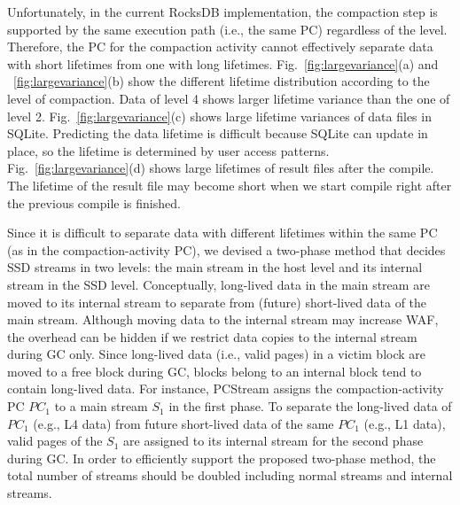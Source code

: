 
Unfortunately, in the current RocksDB implementation, the compaction step is supported 
by the same execution path (i.e., the same PC) regardless of the level.
Therefore, the PC for the compaction activity cannot effectively separate data with 
short lifetimes from one with long lifetimes.
Fig.~\ref{fig:largevariance}(a) and ~\ref{fig:largevariance}(b) show
the different lifetime distribution according to the level of compaction.
Data of level 4 shows larger lifetime variance than the one of level 2.
Fig.~\ref{fig:largevariance}(c) shows large lifetime variances of data files in
SQLite.
Predicting the data lifetime is difficult because 
SQLite can update in place, so the lifetime is determined by 
user access patterns.
Fig.~\ref{fig:largevariance}(d) shows large lifetimes of result files after the compile.
The lifetime of the result file may become short when we start compile right after 
the previous compile is finished.

Since it is difficult to separate data with different lifetimes within the same PC 
(as in the compaction-activity PC), we devised a two-phase method that decides SSD 
streams in two levels: the main stream in the host level and 
its internal stream in the SSD level.
Conceptually, long-lived data in the main stream are moved to its internal stream to 
separate from (future) short-lived data of the main stream.
Although moving data to the internal stream may increase WAF,
the overhead can be hidden if we restrict data copies to the internal stream during GC only.
Since long-lived data (i.e., valid pages) in a victim block are moved to a free block during GC, 
blocks belong to an internal block tend to contain long-lived data.
For instance, \textsf{\small PCStream} assigns the compaction-activity PC {\it $PC_1$} to a
main stream {\it $S_1$} in the first phase.
To separate the long-lived data of {\it $PC_1$} (e.g., L4 data) 
from future short-lived data of the same {\it $PC_1$} (e.g., L1 data), 
valid pages of the {\it $S_1$} are assigned to its internal stream for the second phase during GC.
{\color{blue}
In order to efficiently support the proposed two-phase method, the total number of streams 
should be doubled including normal streams and internal streams.
}


